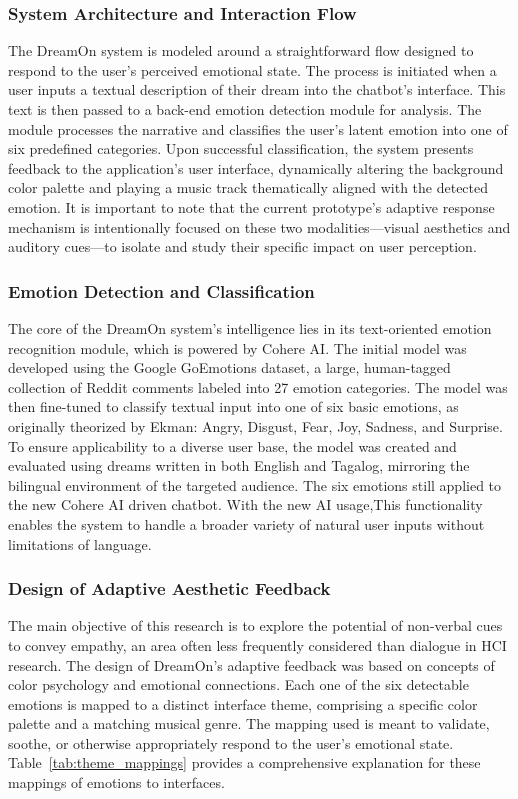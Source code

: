 \documentclass[conference]{IEEEtran}
\begin{document}
	\subsubsection{System Architecture and Interaction Flow}
	The DreamOn system is modeled around a straightforward flow designed to respond to the user's perceived emotional state. The process is initiated when a user inputs a textual description of their dream into the chatbot's interface. This text is then passed to a back-end emotion detection module for analysis. The module processes the narrative and classifies the user's latent emotion into one of six predefined categories. Upon successful classification, the system presents feedback to the application's user interface, dynamically altering the background color palette and playing a music track thematically aligned with the detected emotion. It is important to note that the current prototype's adaptive response mechanism is intentionally focused on these two modalities—visual aesthetics and auditory cues—to isolate and study their specific impact on user perception.
	
	\subsubsection{Emotion Detection and Classification}
	The core of the DreamOn system's intelligence lies in its text-oriented emotion recognition module, which is powered by Cohere AI. The initial model was developed using the Google GoEmotions dataset, a large, human-tagged collection of Reddit comments labeled into 27 emotion categories. The model was then fine-tuned to classify textual input into one of six basic emotions, as originally theorized by Ekman: Angry, Disgust, Fear, Joy, Sadness, and Surprise. To ensure applicability to a diverse user base, the model was created and evaluated using dreams written in both English and Tagalog, mirroring the bilingual environment of the targeted audience. The six emotions still applied to the new Cohere AI driven chatbot. With the new AI usage,This functionality enables the system to handle a broader variety of natural user inputs without limitations of language.
	
	\subsubsection{Design of Adaptive Aesthetic Feedback}
	The main objective of this research is to explore the potential of non-verbal cues to convey empathy, an area often less frequently considered than dialogue in HCI research. The design of DreamOn's adaptive feedback was based on concepts of color psychology and emotional connections. Each one of the six detectable emotions is mapped to a distinct interface theme, comprising a specific color palette and a matching musical genre. The mapping used is meant to validate, soothe, or otherwise appropriately respond to the user's emotional state. Table~\ref{tab:theme_mappings} provides a comprehensive explanation for these mappings of emotions to interfaces.
	
\end{document}
